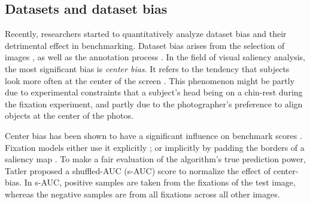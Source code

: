 \subsection{Datasets and dataset bias}\label{sec:reviewBias}
Recently, researchers started to quantitatively analyze dataset bias and their detrimental effect in benchmarking.  Dataset bias arises from the selection of images \cite{torralba2011unbiased}, as well as the annotation process \cite{tatler2005visual}.  In the field of visual saliency analysis, the most significant bias is \emph{center bias}.  It refers to the tendency that subjects look more often at the center of the screen \cite{tatler2005visual}.  This phenomenon might be partly due to experimental constraints that a subject's head being on a chin-rest during the fixation experiment, and partly due to the photographer's preference to align objects at the center of the photos.

Center bias has been shown to have a significant influence on benchmark scores \cite{judd2009learning, zhang2008sun}. Fixation models either use it explicitly \cite{judd2009learning}; or implicitly by padding the borders of a saliency map \cite{harel2006graph, hou2008dynamic, zhang2008sun}.  To make a fair evaluation of the algorithm's true prediction power, Tatler \cite{tatler2005visual} proposed a shuffled-AUC (s-AUC) score to normalize the effect of center-bias.  In s-AUC, positive samples are taken from the fixations of the test image, whereas the negative samples are from all fixations across all other images.














